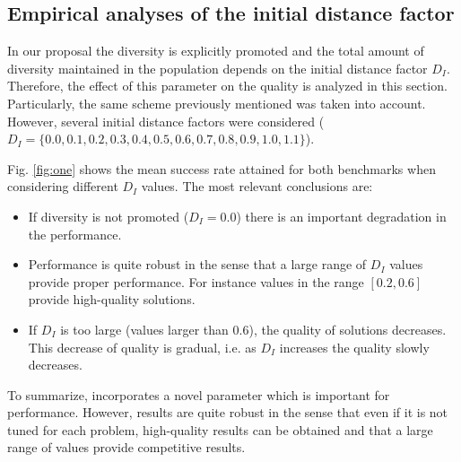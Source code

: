 \subsection{Empirical analyses of the initial distance factor}

In our proposal the diversity is explicitly promoted and the total amount of diversity maintained in the population 
depends on the initial distance factor $D_I$.
%
Therefore, the effect of this parameter on the quality is analyzed in this section.
%
Particularly, the same scheme previously mentioned was taken into account.
%
However, several initial distance factors were considered ($D_I = \{0.0, 0.1, 0.2, 0.3, 0.4, 0.5, 0.6, 0.7, 0.8, 0.9, 1.0, 1.1 \}$).


Fig. \ref{fig:one} shows the mean success rate attained for both benchmarks when considering different $D_I$ values.
%
The most relevant conclusions are:
\begin{itemize}
\item If diversity is not promoted ($D_I = 0.0 $) there is an important degradation in the performance. 
\item Performance is quite robust in the sense that a large range of $D_I$ values provide proper performance. For instance values
in the range $[0.2, 0.6]$ provide high-quality solutions.
\item If $D_I$ is too large (values larger than $0.6$), the quality of solutions decreases. This decrease of quality is gradual, i.e. as $D_I$ increases the quality slowly decreases.
\end{itemize}

To summarize, \DEEDM{} incorporates a novel parameter which is important for performance.
%
However, results are quite robust in the sense that even if it is not tuned for each problem, high-quality results can be obtained and that
a large range of values provide competitive results.
